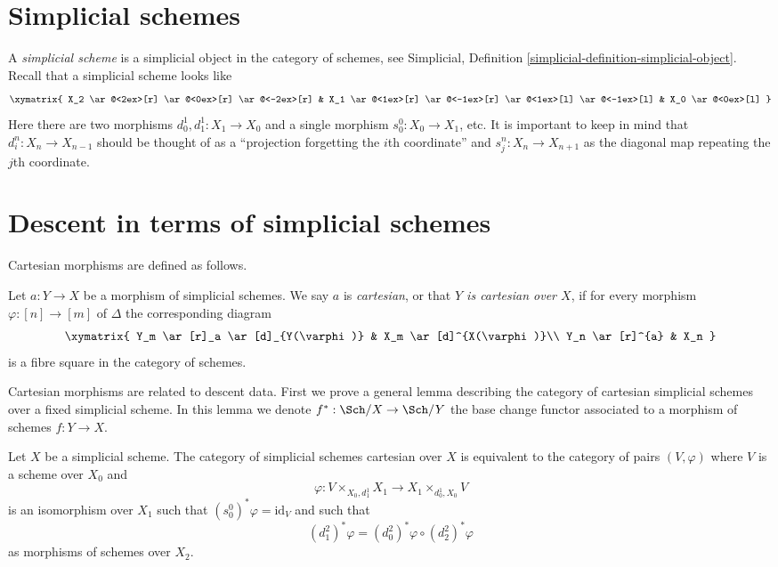 \section{Simplicial schemes}
\label{section-simplicial}

\noindent
A {\it simplicial scheme} is a simplicial object in the category of schemes,
see Simplicial, Definition \ref{simplicial-definition-simplicial-object}.
Recall that a simplicial scheme looks like
$$
\xymatrix{
X_2
\ar@<2ex>[r]
\ar@<0ex>[r]
\ar@<-2ex>[r]
&
X_1
\ar@<1ex>[r]
\ar@<-1ex>[r]
\ar@<1ex>[l]
\ar@<-1ex>[l]
&
X_0
\ar@<0ex>[l]
}
$$
Here there are two morphisms $d^1_0, d^1_1 : X_1 \to X_0$
and a single morphism $s^0_0 : X_0 \to X_1$, etc.
It is important to keep in mind that $d^n_i : X_n \to X_{n - 1}$
should be thought of as a ``projection forgetting the
$i$th coordinate'' and $s^n_j : X_n \to X_{n + 1}$ as the diagonal
map repeating the $j$th coordinate.





\section{Descent in terms of simplicial schemes}
\label{section-simplicial-descent}

\noindent
Cartesian morphisms are defined as follows.

\begin{definition}
\label{definition-cartesian-morphism}
Let $a : Y \to X$ be a morphism of simplicial schemes.
We say $a$ is {\it cartesian}, or that {\it $Y$ is cartesian over $X$},
if for every morphism $\varphi : [n] \to [m]$ of $\Delta$ the corresponding
diagram
$$
\xymatrix{
Y_m \ar[r]_a \ar[d]_{Y(\varphi)} & X_m \ar[d]^{X(\varphi)}\\
Y_n \ar[r]^{a} & X_n
}
$$
is a fibre square in the category of schemes.
\end{definition}

\noindent
Cartesian morphisms are related to descent data. First we prove a general
lemma describing the category of cartesian simplicial schemes over a
fixed simplicial scheme. In this lemma we denote $f^* : \Sch/X \to \Sch/Y$
the base change functor associated to a morphism of schemes $f :Y \to X$.

\begin{lemma}
\label{lemma-characterize-cartesian-schemes}
Let $X$ be a simplicial scheme. The category of simplicial schemes cartesian
over $X$ is equivalent to the category of pairs $(V, \varphi)$
where $V$ is a scheme over $X_0$ and
$$
\varphi :
V \times_{X_0, d^1_1} X_1
\longrightarrow
X_1 \times_{d^1_0, X_0} V
$$
is an isomorphism over $X_1$ such that
$(s_0^0)^*\varphi = \text{id}_V$ and such that
$$
(d^2_1)^*\varphi = (d^2_0)^*\varphi \circ (d^2_2)^*\varphi
$$
as morphisms of schemes over $X_2$.
\end{lemma}

